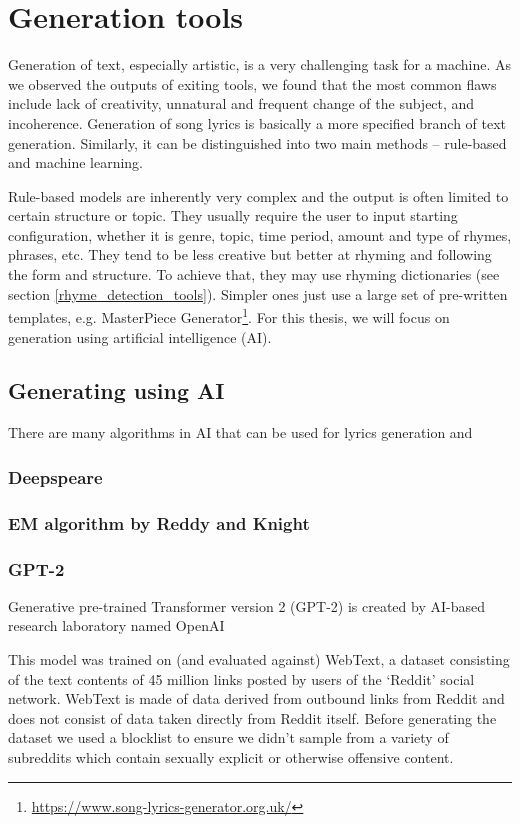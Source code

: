 \section{Generation tools}\label{generation_tools}

Generation of text, especially artistic, is a very challenging task for a machine. As we observed the outputs of exiting tools, we found that the most common flaws include lack of creativity, unnatural and frequent change of the subject, and incoherence. Generation of song lyrics is basically a more specified branch of text generation. Similarly, it can be distinguished into two main methods -- rule-based and machine learning. 

Rule-based models are inherently very complex and the output is often limited to certain structure or topic. They usually require the user to input starting configuration, whether it is genre, topic, time period, amount and type of rhymes, phrases, etc. They tend to be less creative but better at rhyming and following the form and structure. To achieve that, they may use rhyming dictionaries (see section \ref{rhyme_detection_tools}). Simpler ones just use a large set of pre-written templates, e.g. MasterPiece Generator\footnote{\url{https://www.song-lyrics-generator.org.uk/}}. For this thesis, we will focus on generation using artificial intelligence (AI).

\subsection{Generating using AI}
There are many algorithms in AI that can be used for lyrics generation and 
\subsubsection*{Deepspeare}
\subsubsection*{EM algorithm by Reddy and Knight}
\subsubsection*{GPT-2}
Generative pre-trained Transformer version 2 (GPT-2) is created by AI-based research laboratory named OpenAI 

This model was trained on (and evaluated against) WebText, a dataset consisting of the text contents of 45 million links posted by users of the ‘Reddit’ social network. WebText is made of data derived from outbound links from Reddit and does not consist of data taken directly from Reddit itself. Before generating the dataset we used a blocklist to ensure we didn’t sample from a variety of subreddits which contain sexually explicit or otherwise offensive content.

